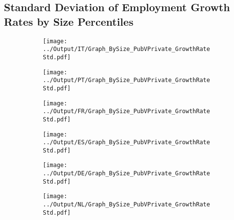 \documentclass[12pt,notitlepage]{article}
\begin{document}
\subsection{Standard Deviation of Employment Growth Rates by Size Percentiles}
\begin{figure}[!htpb]
\centering
\begin{subfigure}{.49\textwidth}
    \centering
 \texttt{[image: ../Output/IT/Graph\_BySize\_PubVPrivate\_GrowthRateStd.pdf]}
\end{subfigure}%
\begin{subfigure}{.49\textwidth}
    \centering
 \texttt{[image: ../Output/PT/Graph\_BySize\_PubVPrivate\_GrowthRateStd.pdf]}
\end{subfigure}
\begin{subfigure}{.49\textwidth}
    \centering
 \texttt{[image: ../Output/FR/Graph\_BySize\_PubVPrivate\_GrowthRateStd.pdf]}
\end{subfigure}%
\begin{subfigure}{.49\textwidth}
    \centering
 \texttt{[image: ../Output/ES/Graph\_BySize\_PubVPrivate\_GrowthRateStd.pdf]}
\end{subfigure}
\begin{subfigure}{.49\textwidth}
    \centering
 \texttt{[image: ../Output/DE/Graph\_BySize\_PubVPrivate\_GrowthRateStd.pdf]}
\end{subfigure}
\begin{subfigure}{.49\textwidth}
    \centering
 \texttt{[image: ../Output/NL/Graph\_BySize\_PubVPrivate\_GrowthRateStd.pdf]}
\end{subfigure}
\end{figure}
\end{document}
